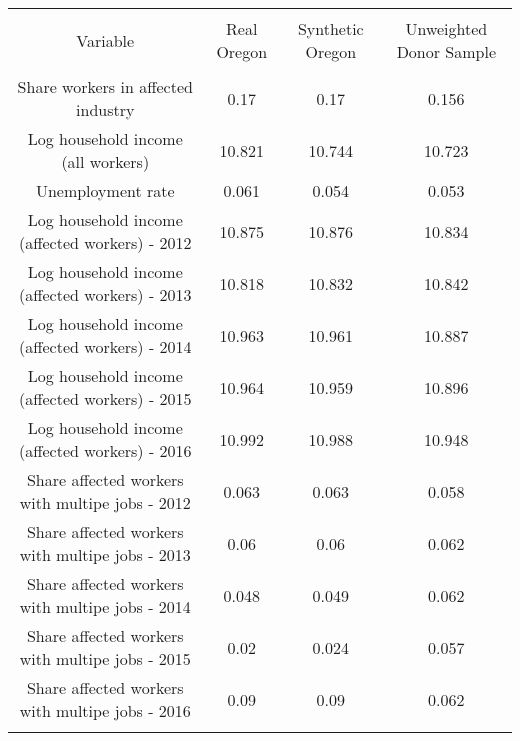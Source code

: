 
\begin{table}[!htbp] \centering 
  \caption{} 
  \label{} 
\begin{tabular}{@{\extracolsep{5pt}} cccc} 
\\[-1.8ex]\hline 
\hline \\[-1.8ex] 
Variable & Real Oregon & Synthetic Oregon & Unweighted Donor Sample \\ 
\hline \\[-1.8ex] 
Share workers in affected industry & 0.17 & 0.17 & 0.156 \\ 
Log household income (all workers) & 10.821 & 10.744 & 10.723 \\ 
Unemployment rate & 0.061 & 0.054 & 0.053 \\ 
Log household income (affected workers) - 2012 & 10.875 & 10.876 & 10.834 \\ 
Log household income (affected workers) - 2013 & 10.818 & 10.832 & 10.842 \\ 
Log household income (affected workers) - 2014 & 10.963 & 10.961 & 10.887 \\ 
Log household income (affected workers) - 2015 & 10.964 & 10.959 & 10.896 \\ 
Log household income (affected workers) - 2016 & 10.992 & 10.988 & 10.948 \\ 
Share affected workers with multipe jobs - 2012 & 0.063 & 0.063 & 0.058 \\ 
Share affected workers with multipe jobs - 2013 & 0.06 & 0.06 & 0.062 \\ 
Share affected workers with multipe jobs - 2014 & 0.048 & 0.049 & 0.062 \\ 
Share affected workers with multipe jobs - 2015 & 0.02 & 0.024 & 0.057 \\ 
Share affected workers with multipe jobs - 2016 & 0.09 & 0.09 & 0.062 \\ 
\hline \\[-1.8ex] 
\end{tabular} 
\end{table} 
